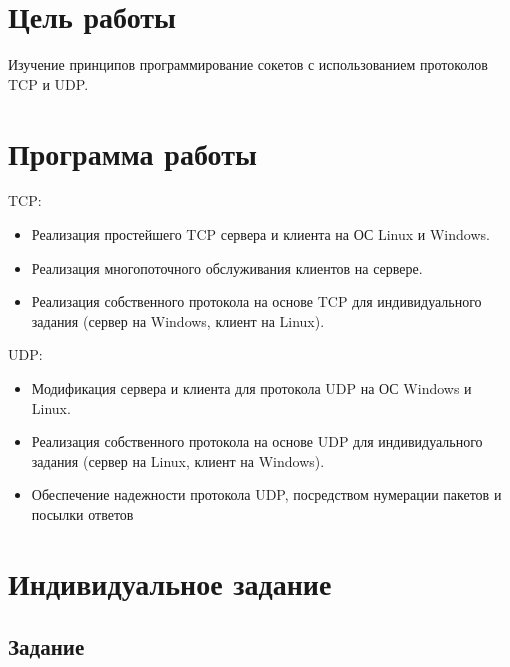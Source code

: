 




%


\makeatletter
\def\lst@PlaceNumber{\llap{\normalfont
                \lst@numberstyle{\the\lst@lineno}\kern\lst@numbersep}}
\makeatother


\section{Цель работы}

Изучение принципов программирование сокетов с использованием протоколов TCP и UDP.

\section{Программа работы}

TCP:

\begin{itemize}
\item Реализация простейшего TCP сервера и клиента на ОС Linux и Windows.
\item Реализация многопоточного обслуживания клиентов на сервере.
\item Реализация собственного протокола на основе TCP для индивидуального задания (сервер на Windows, клиент на Linux).
\end{itemize}

UDP:

\begin{itemize}
\item Модификация сервера и клиента для протокола UDP на ОС Windows и Linux.
\item Реализация собственного протокола на основе UDP для индивидуального задания (сервер на Linux, клиент на Windows).
\item Обеспечение надежности протокола UDP, посредством нумерации пакетов и посылки ответов
\end{itemize}

\section{Индивидуальное задание}

\subsection{Задание} 

